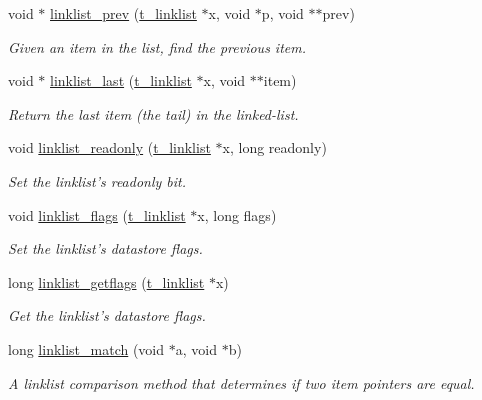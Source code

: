 \begin{DoxyCompactItemize}
void $\ast$ \hyperlink{group__linklist_ga62b4f5fce83130358e652601e1286926}{linklist\_\-prev} (\hyperlink{structt__linklist}{t\_\-linklist} $\ast$x, void $\ast$p, void $\ast$$\ast$prev)
\begin{DoxyCompactList}\small\item\em Given an item in the list, find the previous item. \item\end{DoxyCompactList}\item 
void $\ast$ \hyperlink{group__linklist_gad45ad220a822b64458152e60f504e846}{linklist\_\-last} (\hyperlink{structt__linklist}{t\_\-linklist} $\ast$x, void $\ast$$\ast$item)
\begin{DoxyCompactList}\small\item\em Return the last item (the tail) in the linked-\/list. \item\end{DoxyCompactList}\item 
void \hyperlink{group__linklist_ga95d07cfad7f3a651b1d42482183cd698}{linklist\_\-readonly} (\hyperlink{structt__linklist}{t\_\-linklist} $\ast$x, long readonly)
\begin{DoxyCompactList}\small\item\em Set the linklist's readonly bit. \item\end{DoxyCompactList}\item 
void \hyperlink{group__linklist_gacb89cb9e0a3b6c8e631dd00734643cdb}{linklist\_\-flags} (\hyperlink{structt__linklist}{t\_\-linklist} $\ast$x, long flags)
\begin{DoxyCompactList}\small\item\em Set the linklist's datastore flags. \item\end{DoxyCompactList}\item 
long \hyperlink{group__linklist_gacbef4ef795d257b8686aa274049efa4a}{linklist\_\-getflags} (\hyperlink{structt__linklist}{t\_\-linklist} $\ast$x)
\begin{DoxyCompactList}\small\item\em Get the linklist's datastore flags. \item\end{DoxyCompactList}\item 
long \hyperlink{group__linklist_ga2a991fb645404fe7d9d3327e5a386b80}{linklist\_\-match} (void $\ast$a, void $\ast$b)
\begin{DoxyCompactList}\small\item\em A linklist comparison method that determines if two item pointers are equal. \item\end{DoxyCompactList}\end{DoxyCompactItemize}


